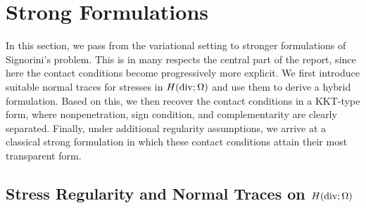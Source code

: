 \section{Strong Formulations}

In this section, we pass from the variational setting to stronger formulations of Signorini's problem. This is in many respects the central part of the report, since here the contact conditions become progressively more explicit. We first introduce suitable normal traces for stresses in $H(\diver;\Omega)$ and use them to derive a hybrid formulation. Based on this, we then recover the contact conditions in a KKT-type form, where nonpenetration, sign condition, and complementarity are clearly separated. Finally, under additional regularity assumptions, we arrive at a classical strong formulation in which these contact conditions attain their most transparent form.

\subsection{Stress Regularity and Normal Traces on \texorpdfstring{$H(\diver;\Omega)$}{Hdiv}}\label{sec:Hdiv}


